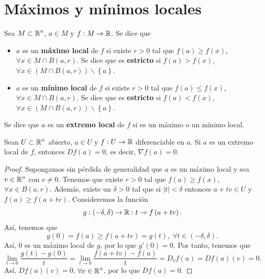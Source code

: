 \section{Máximos y mínimos locales}
\begin{definition}
Sea $\displaystyle M \subset \mathbb{R}^{n} $, $\displaystyle a \in M $ y $\displaystyle f : M \to \mathbb{R} $. Se dice que 
\begin{itemize}
	\item $\displaystyle a $ es un \textbf{máximo local} de $\displaystyle f $ si existe $\displaystyle r > 0 $ tal que $\displaystyle f\left(a\right) \geq f\left(x\right) $, $\displaystyle \forall x \in M \cap B\left(a,r\right) $. Se dice que es \textbf{estricto} si $\displaystyle f\left(a\right) > f\left(x\right) $, $\displaystyle \forall x \in \left(M \cap B\left(a,r\right)\right)\backslash \left\{ a\right\}  $. 
	\item $\displaystyle a $ es un \textbf{mínimo local} de $\displaystyle f $ si existe $\displaystyle r > 0 $ tal que $\displaystyle f\left(a\right) \leq f\left(x\right) $, $\displaystyle \forall x \in M \cap B\left(a,r\right) $. Se dice que es \textbf{estricto} si $\displaystyle f\left(a\right) < f\left(x\right) $, $\displaystyle \forall x\in \left(M \cap B\left(a,r\right)\right)\backslash \left\{ a\right\}  $.
\end{itemize}
Se dice que $\displaystyle a $ es un \textbf{extremo local} de $\displaystyle f $ si es un máximo o un mínimo local.
\end{definition}
\begin{prop}
Sean $\displaystyle U \subset \mathbb{R}^{n} $ abierto, $\displaystyle a \in U $ y $\displaystyle f : U \to \mathbb{R} $ diferenciable en $\displaystyle a $. Si $\displaystyle a $ es un extremo local de $\displaystyle f $, entonces $\displaystyle Df\left(a\right) = 0 $, es decir, $\displaystyle \nabla f\left(a\right)= 0 $.
\end{prop}
\begin{proof}
Supongamos sin pérdida de generalidad que $\displaystyle a $ es un máximo local y sea $\displaystyle v \in \mathbb{R}^{n} $ con $\displaystyle v \neq 0 $. Tenemos que existe $\displaystyle r > 0 $ tal que $\displaystyle f\left(a\right) \geq f\left(x\right) $, $\displaystyle \forall x \in B\left(a,r\right) $. Además, existe un $\displaystyle \delta > 0 $ tal que si $\displaystyle \left|t\right| < \delta  $ entonces $\displaystyle a+tv\in U $ y $\displaystyle f\left(a\right) \geq f\left(a+tv\right) $. Consideremos la función
	\[g : \left(-\delta, \delta \right) \to \mathbb{R} : t \to f\left(a + tv\right) .\]
Así, tenemos que 
\[g\left(0\right) = f\left(a\right) \geq f\left(a+tv\right) = g\left(t\right), \; \forall t \in \left(-\delta, \delta \right) .\]
Así, $\displaystyle 0 $ es un máximo local de $\displaystyle g $, por lo que $\displaystyle g'\left(0\right) = 0 $. Por tanto, tenemos que 
\[\lim_{t \to 0}\frac{g\left(t\right)-g\left(0\right)}{t} = \lim_{t \to 0}\frac{f\left(a+tv\right)-f\left(a\right)}{t} = D_{v}f\left(a\right) = Df\left(a\right)\left(v\right) = 0 .\]
Así, $\displaystyle Df\left(a\right)\left(v\right) = 0 $, $\displaystyle \forall v \in \mathbb{R}^{n} $, por lo que $\displaystyle Df\left(a\right) = 0 $.
\end{proof}

